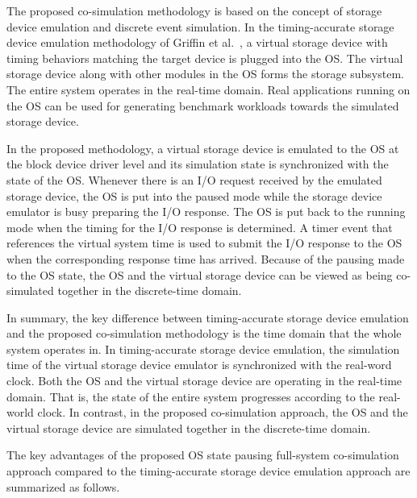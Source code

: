 The proposed co-simulation methodology is based on the concept of storage device emulation and discrete event simulation. In the timing-accurate storage device emulation methodology of Griffin et al.~\cite{Griffin:2002}, a virtual storage device with timing behaviors matching the target device is plugged into the OS. The virtual storage device along with other modules in the OS forms the storage subsystem. The entire system operates in the real-time domain. Real applications running on the OS can be used for generating benchmark workloads towards the simulated storage device.

In the proposed methodology, a virtual storage device is emulated to the OS at the block device driver level and its simulation state is synchronized with the state of the OS. Whenever there is an I/O request received by the emulated storage device, the OS is put into the paused mode while the storage device emulator is busy preparing the I/O response. The OS is put back to the running mode when the timing for the I/O response is determined. A timer event that references the virtual system time is used to submit the I/O response to the OS when the corresponding response time has arrived. Because of the pausing made to the OS state, the OS and the virtual storage device can be viewed as being co-simulated together in the discrete-time domain.

In summary, the key difference between timing-accurate storage device emulation and the proposed co-simulation methodology is the time domain that the whole system operates in. In timing-accurate storage device emulation, the simulation time of the virtual storage device emulator is synchronized with the real-word clock. Both the OS and the virtual storage device are operating in the real-time domain. That is, the state of the entire system progresses according to the real-world clock. In contrast, in the proposed co-simulation approach, the OS and the virtual storage device are simulated together in the discrete-time domain.

The key advantages of the proposed OS state pausing full-system co-simulation approach compared to the timing-accurate storage device emulation approach are summarized as follows.

